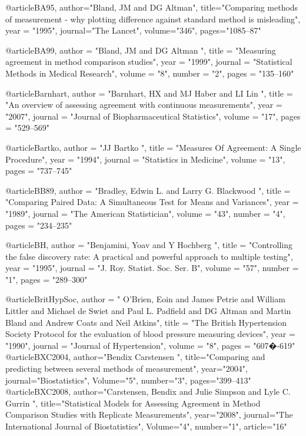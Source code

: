 @article{BA95,
	author="Bland, JM and DG Altman",
	title="Comparing methods of measurement - why plotting difference against standard method is misleading",
	year = "1995",
	journal="The Lancet",
	volume="346",
	pages="1085--87"
}

@article{BA99,
	author = "Bland, JM and DG Altman ",
	title = "Measuring agreement in method comparison studies",
	year = "1999",
	journal = "Statistical Methods in Medical Research",
	volume = "8",
	number = "2",
	pages = "135--160"
}


@article{Barnhart,
	author = "Barnhart, HX and MJ Haber and LI Lin ",
	title = "An overview of assessing agreement with continuous measurements",
	year = "2007",
	journal = "Journal of Biopharmaceutical Statistics",
	volume = "17",	
	pages = "529--569"
}


@article{Bartko,
	author = "JJ Bartko ",
	title = "Measures Of Agreement: A Single Procedure",
	year = "1994",
	journal = "Statistics in Medicine",
	volume = "13",	
	pages = "737--745"
}


@article{BB89,
	author = "Bradley, Edwin L. and Larry G. Blackwood ",
	title = "Comparing Paired Data: A Simultaneous Test for Means and Variances",
	year = "1989",
	journal = "The American Statistician",
	volume = "43",
	number = "4",
	pages = "234--235"
}


@article{BH,
	author = "Benjamini, Yoav and Y Hochberg  ",
	title = "Controlling the false discovery rate: A
	practical and powerful approach to multiple testing",
	year = "1995",
	journal = "J. Roy. Statist. Soc. Ser. B",
	volume = "57",
	number = "1",
	pages = "289--300"
}

@article{BritHypSoc,
	author = " O'Brien, Eoin and James Petrie and William Littler and Michael de Swiet and Paul L. Padfield and DG Altman and
	Martin Bland and Andrew Coats and Neil Atkins",
	title = "The {B}ritish {H}ypertension {S}ociety Protocol for the evaluation of blood pressure measuring devices",
	year = "1990",
	journal = "Journal of Hypertension",
	volume = "8",
	pages = "607�-619"
}
@article{BXC2004,
	author="Bendix Carstensen ",
	title="Comparing and predicting between several methods of measurement",
	year="2004",
	journal="Biostatistics",
	Volume="5",
	number="3",
	pages="399--413"
}
@article{BXC2008,
	author="Carstensen, Bendix and Julie Simpson and Lyle C. Gurrin ",
	title="Statistical Models for Assessing Agreement in Method Comparison Studies with Replicate Measurements",
	year="2008",
	journal="The International Journal of Biostatistics",
	Volume="4",
	number="1",
	article="16"
}

